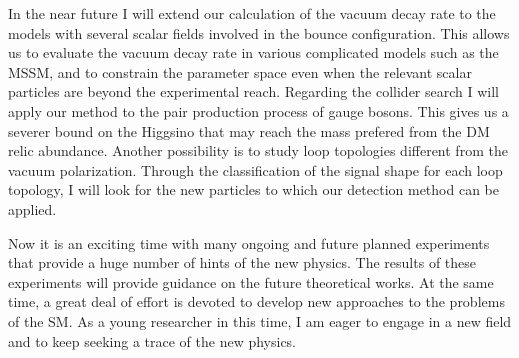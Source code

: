 \documentclass[12pt,notitlepage]{article}
\begin{document}
In the near future I will extend our calculation of the vacuum decay rate to the models with several scalar fields involved in the bounce configuration.
This allows us to evaluate the vacuum decay rate in various complicated models such as the MSSM, and to constrain the parameter space even when the relevant scalar particles are beyond the experimental reach.
Regarding the collider search I will apply our method to the pair production process of gauge bosons.
This gives us a severer bound on the Higgsino that may reach the mass prefered from the DM relic abundance.
Another possibility is to study loop topologies different from the vacuum polarization.
Through the classification of the signal shape for each loop topology, I will look for the new particles to which our detection method can be applied.

Now it is an exciting time with many ongoing and future planned experiments that provide a huge number of hints of the new physics.
The results of these experiments will provide guidance on the future theoretical works.
At the same time, a great deal of effort is devoted to develop new approaches to the problems of the SM.
As a young researcher in this time, I am eager to engage in a new field and to keep seeking a trace of the new physics.
\end{document}
